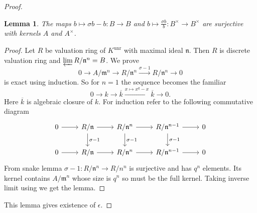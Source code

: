 \documentclass[twoside, 12pt]{iiser-thesis}
\newtheorem{lem}[thm]{ Lemma}
\newcommand{\x}{\times}
\newcommand{\un}{\text{unr}}
\begin{document}
\begin{proof}
\begin{lem}
The maps $b\mapsto \sigma b -b:B \rightarrow B$ and  $b\mapsto \frac{\sigma b}{b}:B^\times \rightarrow B^\times $  are surjective with kernels $A$ and $ A^\x$.
\end{lem}
\begin{proof}
Let $R$ be valuation ring of $K^\un$ with maximal ideal  $\mathfrak n$. Then $R$ is discrete valuation ring and $\varprojlim R/\mathfrak n ^n = B$. We prove $$0 \rightarrow A/\mathfrak m ^n \rightarrow R/\mathfrak n^n \xrightarrow{\sigma -1} R / \mathfrak n^n \rightarrow 0$$ is exact using induction. So for $n=1$ the sequence becomes the familiar $$ 0 \rightarrow k \rightarrow \overline k \xrightarrow{x \mapsto x^q-x} \overline k \rightarrow 0.$$
Here $\overline k$ is algebraic closure of $k$. For induction refer to the following commutative diagram 
\[
\begin{tikzcd}
0 \arrow[r] & R/\mathfrak n \arrow[r] \arrow[d , "\sigma -1"] & R/\mathfrak n^n \arrow[r] \arrow[d, "\sigma -1"] & R/\mathfrak n^{n-1} \arrow[r] \arrow[d, "\sigma -1"] & 0 \\
0 \arrow[r] & R/\mathfrak n \arrow[r] & R/ \mathfrak n ^n \arrow[r] & R/\mathfrak n ^{n-1} \arrow[r] & 0
\end{tikzcd}
\]
From snake lemma $\sigma -1: R/\mathfrak n^n \rightarrow R/ n ^n$ is surjective and has $q^n$ elements. Its kernel contains $A/\mathfrak m ^n$ whose size is $q^n$ so must be the full kernel. Taking inverse limit using we get the lemma.
\end{proof}
This lemma gives existence of $\epsilon$.
\end{proof}



\end{document}
